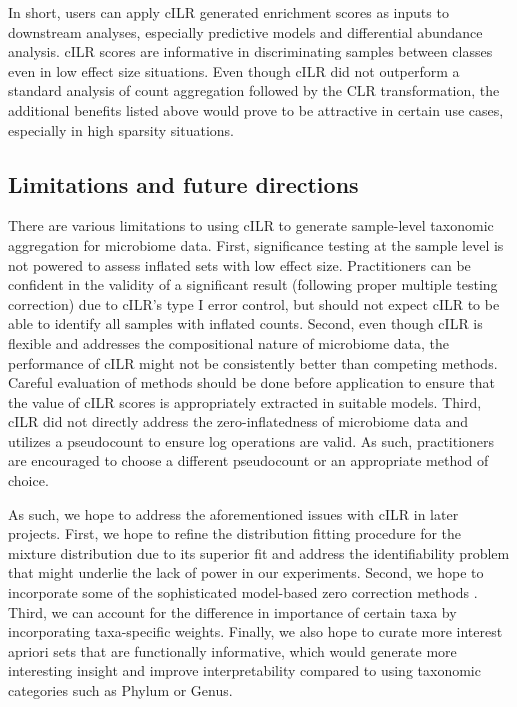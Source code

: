 \documentclass{article}
\begin{document}
In short, users can apply cILR generated enrichment scores as inputs to downstream analyses, especially predictive models and differential abundance analysis. cILR scores are informative in discriminating samples between classes even in low effect size situations. Even though cILR did not outperform a standard analysis of count aggregation followed by the CLR transformation, the additional benefits listed above would prove to be attractive in certain use cases, especially in high sparsity situations. 

\subsection*{Limitations and future directions}
There are various limitations to using cILR to generate sample-level taxonomic aggregation for microbiome data. First, significance testing at the sample level is not powered to assess inflated sets with low effect size. Practitioners can be confident in the validity of a significant result (following proper multiple testing correction) due to cILR's type I error control, but should not expect cILR to be able to identify all samples with inflated counts. Second, even though cILR is flexible and addresses the compositional nature of microbiome data, the performance of cILR might not be consistently better than competing methods. Careful evaluation of methods should be done before application to ensure that the value of cILR scores is appropriately extracted in suitable models. Third, cILR did not directly address the zero-inflatedness of microbiome data and utilizes a pseudocount to ensure log operations are valid. As such, practitioners are encouraged to choose a different pseudocount or an appropriate method of choice.   

As such, we hope to address the aforementioned issues with cILR in later projects. First, we hope to refine the distribution fitting procedure for the mixture distribution due to its superior fit and address the identifiability problem that might underlie the lack of power in our experiments. Second, we hope to incorporate some of the sophisticated model-based zero correction methods \cite{martin-fernandez2012,kaul2017a}. Third, we can account for the difference in importance of certain taxa by incorporating taxa-specific weights. Finally, we also hope to curate more interest apriori sets that are functionally informative, which would generate more interesting insight and improve interpretability compared to using taxonomic categories such as Phylum or Genus. 
\end{document}
